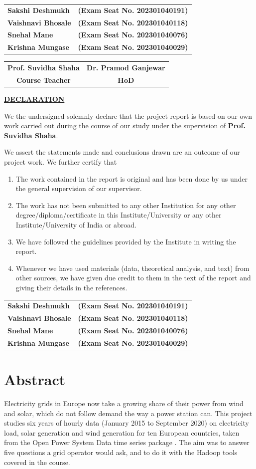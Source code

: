 \documentclass[12pt,a4paper]{report}
\makeatletter
\newcommand{\guide}{Prof. Suvidha Shaha}
\newcommand{\hod}{Dr. Pramod Ganjewar}
\newcommand{\members}{%
  \begin{tabular}{@{}p{6cm}l@{}}
  \textbf{Sakshi Deshmukh}   & \textbf{(Exam Seat No. 202301040191)}\\[4pt]
  \textbf{Vaishnavi Bhosale} & \textbf{(Exam Seat No. 202301040118)}\\[4pt]
  \textbf{Snehal Mane}       & \textbf{(Exam Seat No. 202301040076)}\\[4pt]
  \textbf{Krishna Mungase}   & \textbf{(Exam Seat No. 202301040029)}
  \end{tabular}}
\makeatother
\begin{document}
\vspace{1cm}
\begin{center}\members\end{center}
\vspace{1.5cm}
\begin{tabular*}{\textwidth}{@{\extracolsep{\fill}}cc}
\textbf{\guide} & \textbf{\hod}\\
\textbf{Course Teacher} & \textbf{HoD}
\end{tabular*}
\clearpage

\thispagestyle{empty}
\begin{center}{\Large\bfseries\underline{DECLARATION}}\end{center}
\vspace{0.4cm}
We the undersigned solemnly declare that the project report is based on our own work carried out during the course of our study under the supervision of \textbf{\guide}.

We assert the statements made and conclusions drawn are an outcome of our project work. We further certify that
\begin{enumerate}
\item The work contained in the report is original and has been done by us under the general supervision of our supervisor.
\item The work has not been submitted to any other Institution for any other degree/diploma/certificate in this Institute/University or any other Institute/University of India or abroad.
\item We have followed the guidelines provided by the Institute in writing the report.
\item Whenever we have used materials (data, theoretical analysis, and text) from other sources, we have given due credit to them in the text of the report and giving their details in the references.
\end{enumerate}
\vspace{1cm}
\begin{center}\members\end{center}
\clearpage

\setcounter{page}{4}

\chapter*{Abstract}
Electricity grids in Europe now take a growing share of their power from wind and solar, which do not follow demand the way a power station can. This project studies six years of hourly data (January 2015 to September 2020) on electricity load, solar generation and wind generation for ten European countries, taken from the Open Power System Data time series package \cite{opsd2020,wiese2019}. The aim was to answer five questions a grid operator would ask, and to do it with the Hadoop tools covered in the course.
\end{document}
